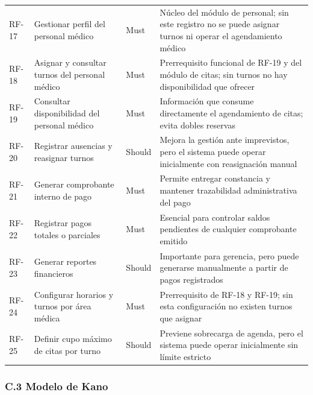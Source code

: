 \documentclass[11pt,a4paper]{article}
\begin{document}
\begin{longtable}{p{} p{} p{} p{}}
		RF-17 & Gestionar perfil del personal médico & Must & Núcleo del módulo de personal; sin este registro no se puede asignar turnos ni operar el agendamiento médico \\
		RF-18 & Asignar y consultar turnos del personal médico & Must & Prerrequisito funcional de RF-19 y del módulo de citas; sin turnos no hay disponibilidad que ofrecer \\
		RF-19 & Consultar disponibilidad del personal médico & Must & Información que consume directamente el agendamiento de citas; evita dobles reservas \\
		RF-20 & Registrar ausencias y reasignar turnos & Should & Mejora la gestión ante imprevistos, pero el sistema puede operar inicialmente con reasignación manual \\
		RF-21 & Generar comprobante interno de pago & Must & Permite entregar constancia y mantener trazabilidad administrativa del pago \\
		RF-22 & Registrar pagos totales o parciales & Must & Esencial para controlar saldos pendientes de cualquier comprobante emitido \\
		RF-23 & Generar reportes financieros & Should & Importante para gerencia, pero puede generarse manualmente a partir de pagos registrados \\
		RF-24 & Configurar horarios y turnos por área médica & Must & Prerrequisito de RF-18 y RF-19; sin esta configuración no existen turnos que asignar \\
		RF-25 & Definir cupo máximo de citas por turno & Should & Previene sobrecarga de agenda, pero el sistema puede operar inicialmente sin límite estricto \\
	\end{longtable}
	
	\subsubsection{C.3 Modelo de Kano}
	
\end{document}
